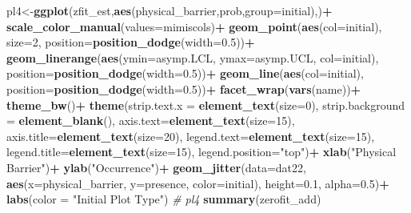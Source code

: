 \documentclass[
]{article}
\newenvironment{Shaded}{\begin{snugshade}}{\end{snugshade}}
\newcommand{\AttributeTok}[1]{\textcolor[rgb]{0.13,0.29,0.53}{#1}}
\newcommand{\CommentTok}[1]{\textcolor[rgb]{0.56,0.35,0.01}{\textit{#1}}}
\newcommand{\DecValTok}[1]{\textcolor[rgb]{0.00,0.00,0.81}{#1}}
\newcommand{\FloatTok}[1]{\textcolor[rgb]{0.00,0.00,0.81}{#1}}
\newcommand{\FunctionTok}[1]{\textcolor[rgb]{0.13,0.29,0.53}{\textbf{#1}}}
\newcommand{\NormalTok}[1]{#1}
\newcommand{\OtherTok}[1]{\textcolor[rgb]{0.56,0.35,0.01}{#1}}
\newcommand{\SpecialCharTok}[1]{\textcolor[rgb]{0.81,0.36,0.00}{\textbf{#1}}}
\newcommand{\StringTok}[1]{\textcolor[rgb]{0.31,0.60,0.02}{#1}}
\begin{document}
\begin{Shaded}
\begin{Highlighting}[]
\NormalTok{pl4}\OtherTok{\textless{}{-}}\FunctionTok{ggplot}\NormalTok{(zfit\_est,}\FunctionTok{aes}\NormalTok{(physical\_barrier,prob,}\AttributeTok{group=}\NormalTok{initial),)}\SpecialCharTok{+}
  \FunctionTok{scale\_color\_manual}\NormalTok{(}\AttributeTok{values=}\NormalTok{mimiscols)}\SpecialCharTok{+}
  \FunctionTok{geom\_point}\NormalTok{(}\FunctionTok{aes}\NormalTok{(}\AttributeTok{col=}\NormalTok{initial), }\AttributeTok{size=}\DecValTok{2}\NormalTok{, }\AttributeTok{position=}\FunctionTok{position\_dodge}\NormalTok{(}\AttributeTok{width=}\FloatTok{0.5}\NormalTok{))}\SpecialCharTok{+}
  \FunctionTok{geom\_linerange}\NormalTok{(}\FunctionTok{aes}\NormalTok{(}\AttributeTok{ymin=}\NormalTok{asymp.LCL, }\AttributeTok{ymax=}\NormalTok{asymp.UCL, }\AttributeTok{col=}\NormalTok{initial), }\AttributeTok{position=}\FunctionTok{position\_dodge}\NormalTok{(}\AttributeTok{width=}\FloatTok{0.5}\NormalTok{))}\SpecialCharTok{+}
  \FunctionTok{geom\_line}\NormalTok{(}\FunctionTok{aes}\NormalTok{(}\AttributeTok{col=}\NormalTok{initial), }\AttributeTok{position=}\FunctionTok{position\_dodge}\NormalTok{(}\AttributeTok{width=}\FloatTok{0.5}\NormalTok{))}\SpecialCharTok{+}
  \FunctionTok{facet\_wrap}\NormalTok{(}\FunctionTok{vars}\NormalTok{(name))}\SpecialCharTok{+}
  \FunctionTok{theme\_bw}\NormalTok{()}\SpecialCharTok{+}
  \FunctionTok{theme}\NormalTok{(}\AttributeTok{strip.text.x =} \FunctionTok{element\_text}\NormalTok{(}\AttributeTok{size=}\DecValTok{0}\NormalTok{),}
        \AttributeTok{strip.background =} \FunctionTok{element\_blank}\NormalTok{(),}
        \AttributeTok{axis.text=}\FunctionTok{element\_text}\NormalTok{(}\AttributeTok{size=}\DecValTok{15}\NormalTok{),}
        \AttributeTok{axis.title=}\FunctionTok{element\_text}\NormalTok{(}\AttributeTok{size=}\DecValTok{20}\NormalTok{),}
        \AttributeTok{legend.text=}\FunctionTok{element\_text}\NormalTok{(}\AttributeTok{size=}\DecValTok{15}\NormalTok{),}
        \AttributeTok{legend.title=}\FunctionTok{element\_text}\NormalTok{(}\AttributeTok{size=}\DecValTok{15}\NormalTok{),}
        \AttributeTok{legend.position=}\StringTok{"top"}\NormalTok{)}\SpecialCharTok{+}
  \FunctionTok{xlab}\NormalTok{(}\StringTok{"Physical Barrier"}\NormalTok{)}\SpecialCharTok{+}
  \FunctionTok{ylab}\NormalTok{(}\StringTok{"Occurrence"}\NormalTok{)}\SpecialCharTok{+}
  \FunctionTok{geom\_jitter}\NormalTok{(}\AttributeTok{data=}\NormalTok{dat22,}
              \FunctionTok{aes}\NormalTok{(}\AttributeTok{x=}\NormalTok{physical\_barrier, }\AttributeTok{y=}\NormalTok{presence, }\AttributeTok{color=}\NormalTok{initial), }
              \AttributeTok{height=}\FloatTok{0.1}\NormalTok{,}
              \AttributeTok{alpha=}\FloatTok{0.5}\NormalTok{)}\SpecialCharTok{+}
  \FunctionTok{labs}\NormalTok{(}\AttributeTok{color =} \StringTok{"Initial Plot Type"}\NormalTok{)}
\CommentTok{\# pl4}
\FunctionTok{summary}\NormalTok{(zerofit\_add)}
\end{Highlighting}
\end{Shaded}
\end{document}

